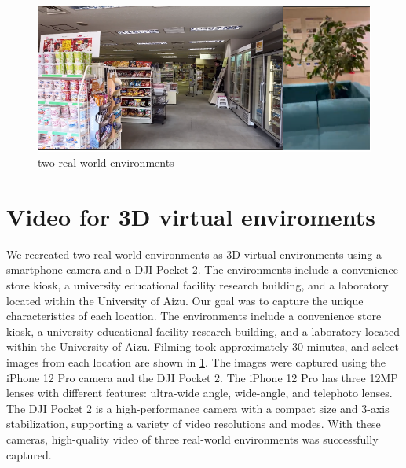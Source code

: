 \singlespacing
\begin{figure}[htbp]
  \centering
  \includegraphics[scale=0.6]{./Figure/画像24.png}
  
  \caption{two real-world environments}
  \label{fig:two real-world environments}
\end{figure}
\section{Video for 3D virtual enviroments}
\label{sec:video for 3D virtual enviroments}
\singlespacing
We recreated two real-world environments as 3D virtual environments using a smartphone camera and a DJI Pocket 2. The environments include a convenience store kiosk, a university educational facility research building, and a laboratory located within the University of Aizu. Our goal was to capture the unique characteristics of each location. The environments include a convenience store kiosk, a university educational facility research building, and a laboratory located within the University of Aizu. Filming took approximately 30 minutes, and select images from each location are shown in \ref{fig:two real-world environments}.
\singlespacing
The images were captured using the iPhone 12 Pro camera and the DJI Pocket 2. The iPhone 12 Pro has three 12MP lenses with different features: ultra-wide angle, wide-angle, and telephoto lenses. The DJI Pocket 2 is a high-performance camera with a compact size and 3-axis stabilization, supporting a variety of video resolutions and modes. With these cameras, high-quality video of three real-world environments was successfully captured.



